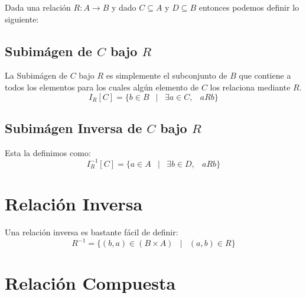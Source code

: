 \documentclass[12pt, fleqn]{report}                             %
\DeclareMathOperator \Space {\quad}                             %
\DeclareMathOperator \MiniSpace {\;}                            %
\newcommand \Such {\MiniSpace|\MiniSpace}                       %
\begin{document}
            Dada una relación $R: A \to B$ y dado $C \subseteq A$ y $D \subseteq B$
            entonces podemos definir lo siguiente:

            \subsection*{Subimágen de $C$ bajo $R$}

                La Subimágen de $C$ bajo $R$ es simplemente el subconjunto de $B$ que contiene
                a todos los elementos para los cuales algún elemento de $C$ los relaciona
                mediante $R$.
                \begin{equation}
                    I_R[C] = \{ b \in B \Such \exists a \in C, \MiniSpace aRb \}
                \end{equation}


                \subsection*{Subimágen Inversa de $C$ bajo $R$}

                Esta la definimos como:
                \begin{equation}
                    I_R^{-1}[C] = \{ a \in A \Such \exists b \in D, \MiniSpace aRb \}
                \end{equation}






        \clearpage
        \section{Relación Inversa}

            Una relación inversa es bastante fácil de definir:
            \begin{equation}
                R^{-1} = \{ (b, a) \in (B \times A) \Such (a, b) \in R \}
            \end{equation}


        \section{Relación Compuesta}
\end{document}
